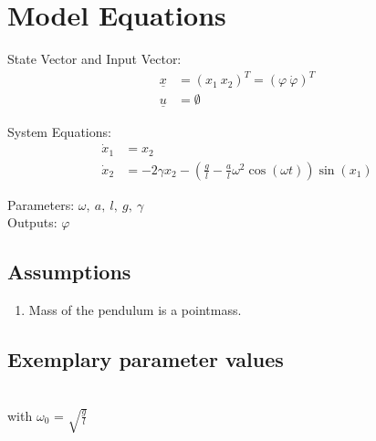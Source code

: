 \documentclass[10pt,a4paper]{article}
\begin{document}
	
	\section{Model Equations} %
	
	State Vector and Input Vector:
	\begin{align*}
		\underline{x} &= (x_1 \ x_2)^T = (\varphi \ \dot{\varphi})^T \\
		\underline{u} &= \emptyset
	\end{align*}
	
	\noindent System Equations:			
	\begin{subequations}
	\begin{align}
		\dot{x}_1 &= x_2 \\
		\dot{x}_2 &= -2\gamma x_2 - \left(\frac{g}{l} - \frac{a}{l}\omega^2\cos(\omega t)\right)\sin(x_1)
	\end{align}
	\end{subequations}

	\noindent
	Parameters: $\omega, ~a, ~l, ~g, ~\gamma$ %
	\\
	Outputs: $\varphi$ %
	
	
	\subsection{Assumptions} %
		\begin{enumerate} %
			\item Mass of the pendulum is a pointmass. 
		\end{enumerate}
	
	
	\subsection{Exemplary parameter values}
	
	\\
	with $\omega_0$ = $\sqrt{\frac{g}{l}}$
\end{document}
